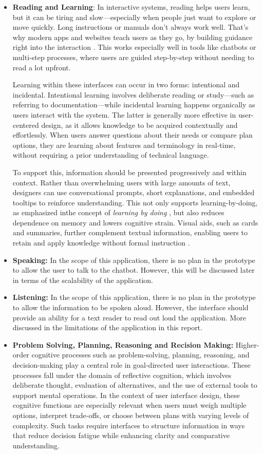 \documentclass[conference]{IEEEtran}
\begin{document}
\begin{itemize}
    \item \textbf{Reading and Learning}: In interactive systems, reading helps users learn, but it can be tiring and slow—especially when people just want to explore or move quickly. Long instructions or manuals don’t always work well. That’s why modern apps and websites teach users as they go, by building guidance right into the interaction \cite{Carroll1990Nurnberg}. This works especially well in tools like chatbots or multi-step processes, where users are guided step-by-step without needing to read a lot upfront.

Learning within these interfaces can occur in two forms: intentional and incidental. Intentional learning involves deliberate reading or study—such as referring to documentation—while incidental learning happens organically as users interact with the system. The latter is generally more effective in user-centered design, as it allows knowledge to be acquired contextually and effortlessly. When users answer questions about their needs or compare plan options, they are learning about features and terminology in real-time, without requiring a prior understanding of technical language.

To support this, information should be presented progressively and within context. Rather than overwhelming users with large amounts of text, designers can use conversational prompts, short explanations, and embedded tooltips to reinforce understanding. This not only supports learning-by-doing, as emphasized inthe concept of \textit{learning by doing} \cite{Carroll1990Nurnberg}, but also reduces dependence on memory and lowers cognitive strain. Visual aids, such as cards and summaries, further complement textual information, enabling users to retain and apply knowledge without formal instruction .
    \item \textbf{Speaking:} In the scope of this application, there is no plan in the prototype to allow the user to talk to the chatbot. However, this will be discussed later in terms of the scalability of the application.
    \item \textbf{Listening:} In the scope of this application, there is no plan in the prototype to allow the information to be spoken aloud. However, the interface should provide an ability for a text reader to read out loud the application. More discussed in the limitations of the application in this report.
    \item \textbf{Problem Solving, Planning, Reasoning and Recision Making:} Higher-order cognitive processes such as problem-solving, planning, reasoning, and decision-making play a central role in goal-directed user interactions. These processes fall under the domain of reflective cognition, which involves deliberate thought, evaluation of alternatives, and the use of external tools to support mental operations. In the context of user interface design, these cognitive functions are especially relevant when users must weigh multiple options, interpret trade-offs, or choose between plans with varying levels of complexity. Such tasks require interfaces to structure information in ways that reduce decision fatigue while enhancing clarity and comparative understanding.

\end{itemize}
\end{document}
